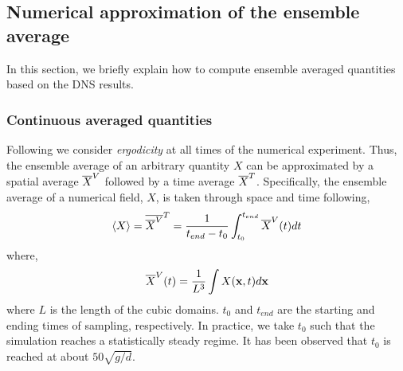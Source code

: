 \subsection{Numerical approximation of the ensemble average}

In this section, we briefly explain how to compute ensemble averaged quantities based on the DNS results. 

\subsubsection{Continuous averaged quantities}

Following \citet{du2022analysis} we consider \textit{ergodicity} at all times of the numerical experiment.
Thus, the ensemble average of an arbitrary quantity $X$ can be approximated by a spatial average $\overline{X}^V$ followed by a time average $\overline{X}^T$. 
Specifically, the ensemble average of a numerical field, $X$, is taken through space and time following,
\begin{equation}
    \left<X\right>
    = \overline{\overline{X}^V}^T
    = \frac{1}{ t_{end} - t_0}\int_{t_0}^{t_{end}} 
    \overline{X}^V(t) dt
\end{equation}
where, 
\begin{equation}
    \overline{X}^V(t)
    = \frac{1}{L^3}\int 
    X(\textbf{x},t) d\textbf{x}
\end{equation}
where $L$ is the length of the cubic domains.
$t_0$ and $t_{end}$ are the starting and ending times of sampling, respectively.
In practice, we take $t_0$ such that the simulation reaches a statistically steady regime.  
It has been observed that $t_0$ is reached at about $50 \sqrt{g/d}$. 

